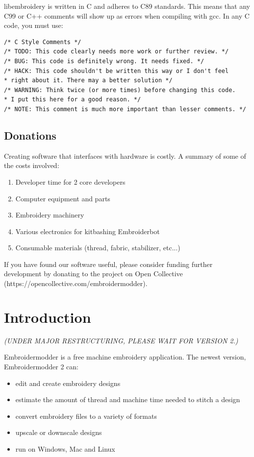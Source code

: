 \documentclass[a4paper]{report}
\begin{document}
libembroidery is written in C and adheres to C89 standards. This means
that any C99 or C++ comments will show up as errors when compiling with
gcc. In any C code, you must use:

\begin{lstlisting}
/* C Style Comments */
/* TODO: This code clearly needs more work or further review. */
/* BUG: This code is definitely wrong. It needs fixed. */
/* HACK: This code shouldn't be written this way or I don't feel
* right about it. There may a better solution */
/* WARNING: Think twice (or more times) before changing this code.
* I put this here for a good reason. */
/* NOTE: This comment is much more important than lesser comments. */
\end{lstlisting}

\subsection{Donations}

Creating software that interfaces with hardware is costly. A summary
of some of the costs involved:

\begin{enumerate}
\item Developer time for 2 core developers
\item Computer equipment and parts
\item Embroidery machinery
\item Various electronics for kitbashing Embroiderbot
\item Consumable materials (thread, fabric, stabilizer, etc...)
\end{enumerate}

If you have found our software useful, please consider funding further
development by donating to the project on Open Collective
(https://opencollective.com/embroidermodder).

\section{Introduction}

\emph{(UNDER MAJOR RESTRUCTURING, PLEASE WAIT FOR VERSION 2.)}

Embroidermodder is a free machine embroidery application.
The newest version, Embroidermodder 2 can:

\begin{itemize}
\item edit and create embroidery designs
\item estimate the amount of thread and machine time needed to stitch a design
\item convert embroidery files to a variety of formats
\item upscale or downscale designs
\item run on Windows, Mac and Linux
\end{itemize}
\end{document}
